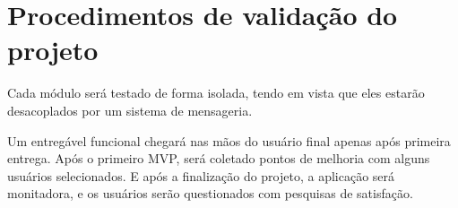 \chapter{Procedimentos de validação do projeto}
\label{c.validacao}


Cada módulo será testado de forma isolada, tendo em vista que eles estarão desacoplados por um sistema de mensageria.

Um entregável funcional chegará nas mãos do usuário final apenas após primeira entrega. Após o primeiro MVP, será coletado pontos de melhoria com alguns usuários selecionados. E após a finalização do projeto, a aplicação será monitadora, e os usuários serão questionados com pesquisas de satisfação.